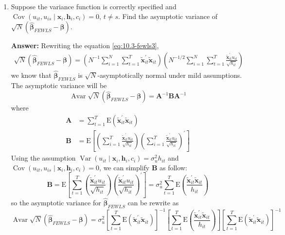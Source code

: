 \begin{enumerate}
\begin{enumerate}
        \item Suppose the variance function is correctly specified and $\operatorname{Cov}\left(u_{i t}, u_{i s} \mid \mathbf{x}_{i}, \mathbf{h}_{i}, c_{i}\right)=0$, $t \neq s .$ Find the asymptotic variance of $\sqrt{N}\left(\hat{\boldsymbol{\beta}}_{F E W L S}-\boldsymbol{\beta}\right)$.
        
        \textbf{Answer:} Rewriting the equation \eqref{eq:10.3-fewls3},
        \begin{gather}
            \sqrt{N}\left(\hat{\boldsymbol{\beta}}_{F E W L S}-\boldsymbol{\beta}\right)=\left(N^{-1} \sum_{i=1}^{N} \sum_{t=1}^{T} \tilde{\mathbf{x}}_{i t}^{\prime} \tilde{\mathbf{x}}_{i t}\right)\left(N^{-1 / 2} \sum_{i=1}^{N} \sum_{t=1}^{T} \frac{\tilde{\mathbf{x}}_{i t}^{\prime} u_{i t}}{\sqrt{h_{i t}}} \right)
        \end{gather}
        we know that $\hat{\bm{\beta}}_{FEWLS}$ is $\sqrt{N}$-asymptotically normal under mild assumptions. The asymptotic variance will be
        \[ \operatorname{Avar} \sqrt{N}\left(\hat{\boldsymbol{\beta}}_{F E W L S}-\boldsymbol{\beta}\right)=\mathbf{A}^{-1} \mathbf{B} \mathbf{A}^{-1} \]
        where
        \begin{align*}
            \mathbf{A} &= \sum_{t=1}^{T} \mathrm{E}\left(\tilde{\mathbf{x}}_{i t}^{\prime} \tilde{\mathbf{x}}_{i t}\right) \\
            \mathbf{B} &= \mathrm{E}\left[\left(\sum_{i=1}^{T} \frac{\tilde{\mathbf{x}}_{i t}^{\prime} u_{i t}}{\sqrt{h_{i t}}} \right)\left(\sum_{i=1}^{T} \frac{\tilde{\mathbf{x}}_{i t}^{\prime} u_{i t}}{\sqrt{h_{i t}}}\right)^{\prime}\right]
        \end{align*}
        Using the assumption $\operatorname{Var}\left(u_{i t} \mid \mathbf{x}_{i}, \mathbf{h}_{i}, c_{i}\right)=\sigma_{u}^{2} h_{i t}$ and $\operatorname{Cov}\left(u_{i t}, u_{i s} \mid \mathbf{x}_{i}, \mathbf{h}_{i}, c_{i}\right)=0$, we can simplify $\mathbf{B}$ as follow:
        \[ \mathbf{B} = \mathrm{E} \left[ \sum_{t=1}^T \left(\frac{\tilde{\mathbf{x}}_{i t}^{\prime} u_{i t}}{\sqrt{h_{i t}}}\right) \left(\frac{\tilde{\mathbf{x}}_{i t}^{\prime} u_{i t}}{\sqrt{h_{i t}}}\right)^{\prime} \right] = \sigma_{u}^{2} \sum_{t=1}^T \mathrm{E}\left(\frac{\tilde{\mathbf{x}}_{i t}^{\prime} \tilde{\mathbf{x}}_{i t}}{h_{i t}}\right) \]
        so the asymptotic variance for $\hat{\boldsymbol{\beta}}_{FEWLS}$ can be rewrite as
        \[ \operatorname{Avar} \sqrt{N}\left(\hat{\boldsymbol{\beta}}_{F E W L S}-\boldsymbol{\beta}\right) = \sigma_{u}^{2} \left[ \sum_{t=1}^{T} \mathrm{E}\left(\tilde{\mathbf{x}}_{i t}^{\prime} \tilde{\mathbf{x}}_{i t}\right) \right]^{-1} \left[ \sum_{t=1}^T \mathrm{E}\left(\frac{\tilde{\mathbf{x}}_{i t}^{\prime} \tilde{\mathbf{x}}_{i t}}{h_{i t}}\right) \right] \left[ \sum_{t=1}^{T} \mathrm{E}\left(\tilde{\mathbf{x}}_{i t}^{\prime} \tilde{\mathbf{x}}_{i t}\right) \right]^{-1} \]
        

\end{enumerate}
\end{enumerate}
